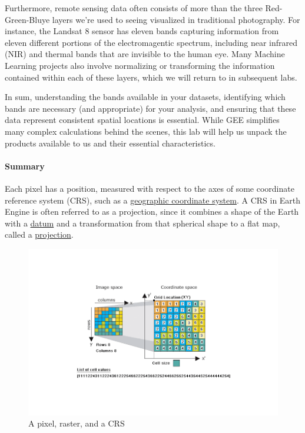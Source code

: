 \documentclass[
]{article}
\begin{document}
Furthermore, remote sensing data often consists of more than the three Red-Green-Bluye layers we're used to seeing visualized in traditional photography. For instance, the Landsat 8 sensor has eleven bands capturing information from eleven different portions of the electromagentic spectrum, including near infrared (NIR) and thermal bands that are invisible to the human eye. Many Machine Learning projects also involve normalizing or transforming the information contained within each of these layers, which we will return to in subsequent labs.

In sum, understanding the bands available in your datasets, identifying which bands are necessary (and appropriate) for your analysis, and ensuring that these data represent consistent spatial locations is essential. While GEE simplifies many complex calculations behind the scenes, this lab will help us unpack the products available to us and their essential characteristics.

\hypertarget{summary}{%
\paragraph{Summary}\label{summary}}

Each pixel has a position, measured with respect to the axes of some coordinate reference system (CRS), such as a \href{https://en.wikipedia.org/wiki/Geographic_coordinate_system}{geographic coordinate system}. A CRS in Earth Engine is often referred to as a projection, since it combines a shape of the Earth with a \href{https://en.wikipedia.org/wiki/Geodetic_datum}{datum} and a transformation from that spherical shape to a flat map, called a \href{https://en.wikipedia.org/wiki/Map_projection}{projection}.

\begin{figure}

{\centering \includegraphics[width=0.8\linewidth]{clip_image002} 

}

\caption{A pixel, raster, and a CRS}\label{fig:pixel}
\end{figure}
\end{document}
